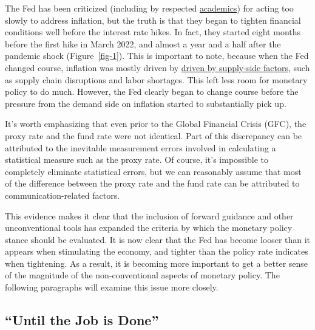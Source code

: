 \documentclass[
  letterpaper,
  DIV=11,
  numbers=noendperiod]{scrartcl}
\begin{document}
The Fed has been criticized (including by respected
\href{https://www.lse.ac.uk/CFM/assets/pdf/CFM-Discussion-Papers-2022/CFMDP2022-09-Paper.pdf}{academics})
for acting too slowly to address inflation, but the truth is that they
began to tighten financial conditions well before the interest rate
hikes. In fact, they started eight months before the first hike in March
2022, and almost a year and a half after the pandemic shock
(Figure~\ref{fig-1}). This is important to note, because when the Fed
changed course, inflation was mostly driven by
\href{https://www.frbsf.org/economic-research/indicators-data/supply-and-demand-driven-pce-inflation/}{driven
by supply-side factors}, such as supply chain disruptions and labor
shortages. This left less room for monetary policy to do much. However,
the Fed clearly began to change course before the pressure from the
demand side on inflation started to substantially pick up.

It's worth emphasizing that even prior to the Global Financial Crisis
(GFC), the proxy rate and the fund rate were not identical. Part of this
discrepancy can be attributed to the inevitable measurement errors
involved in calculating a statistical measure such as the proxy rate. Of
course, it's impossible to completely eliminate statistical errors, but
we can reasonably assume that most of the difference between the proxy
rate and the fund rate can be attributed to communication-related
factors.

This evidence makes it clear that the inclusion of forward guidance and
other unconventional tools has expanded the criteria by which the
monetary policy stance should be evaluated. It is now clear that the Fed
has become looser than it appears when stimulating the economy, and
tighter than the policy rate indicates when tightening. As a result, it
is becoming more important to get a better sense of the magnitude of the
non-conventional aspects of monetary policy. The following paragraphs
will examine this issue more closely.

\hypertarget{until-the-job-is-done}{%
\subsection{``Until the Job is Done''}\label{until-the-job-is-done}}
\end{document}
